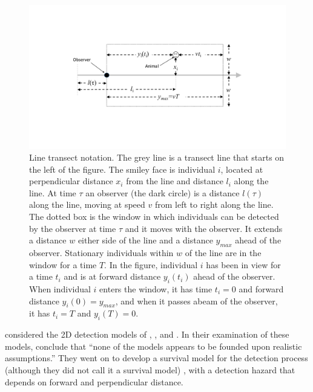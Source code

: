 \documentclass[useAMS,usenatbib,referee]{biom}
\begin{document}
\begin{figure}
\begin{center}
\caption{Line transect notation. The grey line is a transect line that starts on the left of the figure. The smiley face is individual $i$, located at perpendicular distance $x_i$ from the line and distance $l_i$ along the line. At time $\tau$ an observer (the dark circle) is a distance $l(\tau)$ along the line, moving at speed $v$ from left to right along the line. The dotted box is the window in which individuals can be detected by the observer at time $\tau$ and it moves with the observer. It extends a distance $w$ either side of the line and a distance $y_{max}$ ahead of the observer. Stationary individuals within $w$ of the line are in the window for a time $T$. In the figure, individual $i$ has been in view for a time $t_i$ and is at forward distance $y_i(t_i)$ ahead of the observer. When individual $i$ enters the window, it has time $t_i=0$ and  forward distance $y_i(0)=y_{max}$, and when it passes abeam of the observer, it has $t_i=T$ and $y_i(T)=0$. \label{fig:ltT}}
\vspace{12pt}
\includegraphics[width=15cm]{ltT.pdf}
\end{center}
\end{figure}


\citet{Hayes+Buckland:83} considered the 2D detection models of \cite{Hayne:49}, \cite{Eberhardt:78}, \cite{Burnham+Anderson:76} and \cite{Burnham:79}. %
%
%
%
In their examination of these models, \citet[][p 33]{Hayes+Buckland:83} conclude that ``none of the models appears to be founded upon realistic assumptions.'' They went on to develop a survival model for the detection process (although they did not call it a survival model)%
, with a detection hazard that depends on forward and perpendicular distance.
\end{document}

